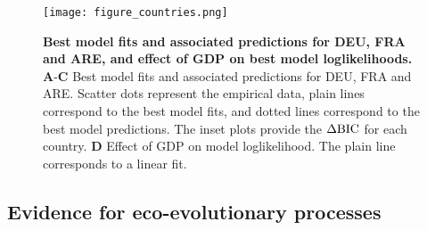\begin{figure}
  \centering
  \texttt{[image: figure\_countries.png]}
  \caption{\small \textbf{Best model fits and associated predictions for DEU, FRA and ARE, and effect of GDP on best model loglikelihoods.}
    \textbf{A}-\textbf{C} Best model fits and associated predictions for DEU, FRA and ARE. Scatter dots represent the empirical data, plain lines correspond to the best model fits, and dotted lines correspond to the best model predictions. The inset plots provide the $\Delta \text{BIC}$ for each country.
    \textbf{D} Effect of GDP on model loglikelihood. The plain line corresponds to a linear fit.
  }\label{fig:fits}
\end{figure}
\FloatBarrier

\subsection{Evidence for eco-evolutionary processes}

